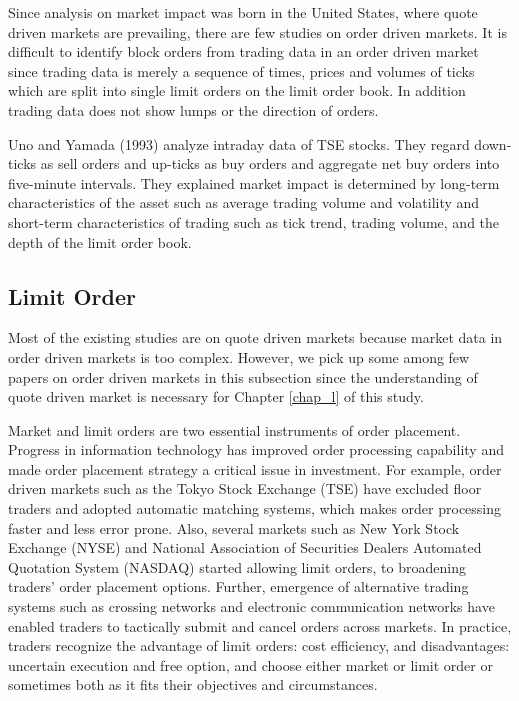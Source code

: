 Since analysis on market impact was born in the United States, where quote driven markets are prevailing, there are few studies on order driven markets.  It is difficult to identify block orders from trading data in an order driven market since trading data is merely a sequence of times, prices and volumes of ticks which are split into single limit orders on the limit order book. In addition trading data does not show lumps or the direction of orders.

Uno and Yamada (1993) analyze intraday data of TSE stocks.  They regard down-ticks as sell orders and up-ticks as buy orders and aggregate net buy orders into five-minute intervals.  They explained market impact is determined by long-term characteristics of the asset such as average trading volume and volatility and short-term characteristics of trading such as tick trend, trading volume, and the depth of the limit order book.

\subsection{Limit Order}\label{subsec_r23}
Most of the existing studies are on quote driven markets because market data in order driven markets is too complex.  However, we pick up some among few papers on order driven markets in this subsection since the understanding of quote driven market is necessary for Chapter \ref{chap_l} of this study.

Market and limit orders are two essential instruments of order placement.  Progress in information technology has improved order processing capability and made order placement strategy a critical issue in investment.  For example, order driven markets such as the Tokyo Stock Exchange (TSE) have excluded floor traders and adopted automatic matching systems, which makes order processing faster and less error prone.  Also, several markets such as New York Stock Exchange (NYSE) and National Association of Securities Dealers Automated Quotation System (NASDAQ) started allowing limit orders, to broadening traders' order placement options.  Further, emergence of alternative trading systems such as crossing networks and electronic communication networks have enabled traders to tactically submit and cancel orders across markets.  In practice, traders recognize the advantage of limit orders: cost efficiency, and disadvantages: uncertain execution and free option, and choose either market or limit order or sometimes both as it fits their objectives and circumstances.  

